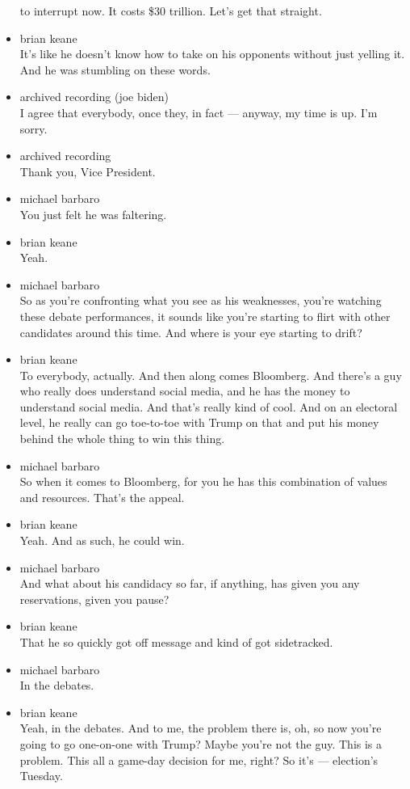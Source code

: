 \begin{itemize}
  to interrupt now. It costs \$30 trillion. Let's get that straight.
\item
  brian keane\\
  It's like he doesn't know how to take on his opponents without just
  yelling it. And he was stumbling on these words.
\item
  archived recording (joe biden)\\
  I agree that everybody, once they, in fact --- anyway, my time is up.
  I'm sorry.
\item
  archived recording\\
  Thank you, Vice President.
\item
  michael barbaro\\
  You just felt he was faltering.
\item
  brian keane\\
  Yeah.
\item
  michael barbaro\\
  So as you're confronting what you see as his weaknesses, you're
  watching these debate performances, it sounds like you're starting to
  flirt with other candidates around this time. And where is your eye
  starting to drift?
\item
  brian keane\\
  To everybody, actually. And then along comes Bloomberg. And there's a
  guy who really does understand social media, and he has the money to
  understand social media. And that's really kind of cool. And on an
  electoral level, he really can go toe-to-toe with Trump on that and
  put his money behind the whole thing to win this thing.
\item
  michael barbaro\\
  So when it comes to Bloomberg, for you he has this combination of
  values and resources. That's the appeal.
\item
  brian keane\\
  Yeah. And as such, he could win.
\item
  michael barbaro\\
  And what about his candidacy so far, if anything, has given you any
  reservations, given you pause?
\item
  brian keane\\
  That he so quickly got off message and kind of got sidetracked.
\item
  michael barbaro\\
  In the debates.
\item
  brian keane\\
  Yeah, in the debates. And to me, the problem there is, oh, so now
  you're going to go one-on-one with Trump? Maybe you're not the guy.
  This is a problem. This all a game-day decision for me, right? So it's
  --- election's Tuesday.


\end{itemize}
